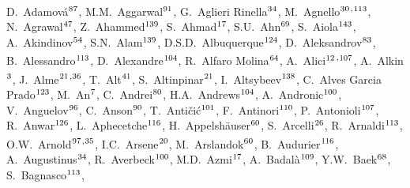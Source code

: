 

\begingroup
\small
\begin{flushleft}
D.~Adamov\'{a}$^\textrm{\scriptsize 87}$,
M.M.~Aggarwal$^\textrm{\scriptsize 91}$,
G.~Aglieri Rinella$^\textrm{\scriptsize 34}$,
M.~Agnello$^\textrm{\scriptsize 30}$\textsuperscript{,}$^\textrm{\scriptsize 113}$,
N.~Agrawal$^\textrm{\scriptsize 47}$,
Z.~Ahammed$^\textrm{\scriptsize 139}$,
S.~Ahmad$^\textrm{\scriptsize 17}$,
S.U.~Ahn$^\textrm{\scriptsize 69}$,
S.~Aiola$^\textrm{\scriptsize 143}$,
A.~Akindinov$^\textrm{\scriptsize 54}$,
S.N.~Alam$^\textrm{\scriptsize 139}$,
D.S.D.~Albuquerque$^\textrm{\scriptsize 124}$,
D.~Aleksandrov$^\textrm{\scriptsize 83}$,
B.~Alessandro$^\textrm{\scriptsize 113}$,
D.~Alexandre$^\textrm{\scriptsize 104}$,
R.~Alfaro Molina$^\textrm{\scriptsize 64}$,
A.~Alici$^\textrm{\scriptsize 12}$\textsuperscript{,}$^\textrm{\scriptsize 107}$,
A.~Alkin$^\textrm{\scriptsize 3}$,
J.~Alme$^\textrm{\scriptsize 21}$\textsuperscript{,}$^\textrm{\scriptsize 36}$,
T.~Alt$^\textrm{\scriptsize 41}$,
S.~Altinpinar$^\textrm{\scriptsize 21}$,
I.~Altsybeev$^\textrm{\scriptsize 138}$,
C.~Alves Garcia Prado$^\textrm{\scriptsize 123}$,
M.~An$^\textrm{\scriptsize 7}$,
C.~Andrei$^\textrm{\scriptsize 80}$,
H.A.~Andrews$^\textrm{\scriptsize 104}$,
A.~Andronic$^\textrm{\scriptsize 100}$,
V.~Anguelov$^\textrm{\scriptsize 96}$,
C.~Anson$^\textrm{\scriptsize 90}$,
T.~Anti\v{c}i\'{c}$^\textrm{\scriptsize 101}$,
F.~Antinori$^\textrm{\scriptsize 110}$,
P.~Antonioli$^\textrm{\scriptsize 107}$,
R.~Anwar$^\textrm{\scriptsize 126}$,
L.~Aphecetche$^\textrm{\scriptsize 116}$,
H.~Appelsh\"{a}user$^\textrm{\scriptsize 60}$,
S.~Arcelli$^\textrm{\scriptsize 26}$,
R.~Arnaldi$^\textrm{\scriptsize 113}$,
O.W.~Arnold$^\textrm{\scriptsize 97}$\textsuperscript{,}$^\textrm{\scriptsize 35}$,
I.C.~Arsene$^\textrm{\scriptsize 20}$,
M.~Arslandok$^\textrm{\scriptsize 60}$,
B.~Audurier$^\textrm{\scriptsize 116}$,
A.~Augustinus$^\textrm{\scriptsize 34}$,
R.~Averbeck$^\textrm{\scriptsize 100}$,
M.D.~Azmi$^\textrm{\scriptsize 17}$,
A.~Badal\`{a}$^\textrm{\scriptsize 109}$,
Y.W.~Baek$^\textrm{\scriptsize 68}$,
S.~Bagnasco$^\textrm{\scriptsize 113}$,

\end{flushleft}

